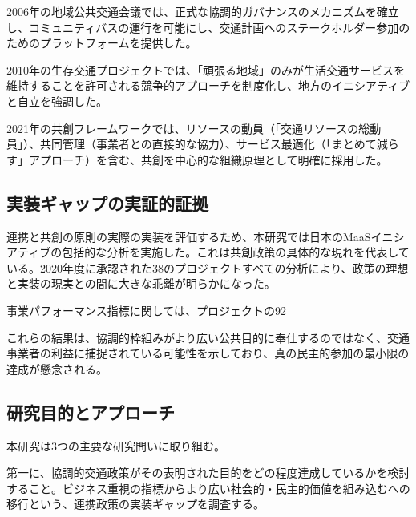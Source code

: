 2006年の地域公共交通会議では、正式な協調的ガバナンスのメカニズムを確立し、コミュニティバスの運行を可能にし、交通計画へのステークホルダー参加のためのプラットフォームを提供した。

2010年の生存交通プロジェクトでは、「頑張る地域」のみが生活交通サービスを維持することを許可される競争的アプローチを制度化し、地方のイニシアティブと自立を強調した。

2021年の共創フレームワークでは、リソースの動員（「交通リソースの総動員」）、共同管理（事業者との直接的な協力）、サービス最適化（「まとめて減らす」アプローチ）を含む、共創を中心的な組織原理として明確に採用した。

\subsection{実装ギャップの実証的証拠}

連携と共創の原則の実際の実装を評価するため、本研究では日本のMaaSイニシアティブの包括的な分析を実施した。これは共創政策の具体的な現れを代表している。2020年度に承認された38のプロジェクトすべての分析により、政策の理想と実装の現実との間に大きな乖離が明らかになった。

事業パフォーマンス指標に関しては、プロジェクトの92%

これらの結果は、協調的枠組みがより広い公共目的に奉仕するのではなく、交通事業者の利益に捕捉されている可能性を示しており、真の民主的参加の最小限の達成が懸念される。

\subsection{研究目的とアプローチ}

本研究は3つの主要な研究問いに取り組む。

第一に、協調的交通政策がその表明された目的をどの程度達成しているかを検討すること。ビジネス重視の指標からより広い社会的・民主的価値を組み込むへの移行という、連携政策の実装ギャップを調査する。

